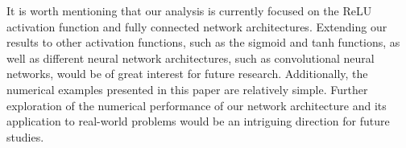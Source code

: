 \documentclass[nohyperref]{article}
\theoremstyle{plain}
\theoremstyle{definition}
\theoremstyle{remark}
\begin{document}
It is worth mentioning that our analysis is currently focused on the ReLU activation function and fully connected network architectures. Extending our results to other activation functions, such as the sigmoid and tanh functions, as well as different neural network architectures, such as convolutional neural networks, %
would be of great interest for future research.
Additionally, the numerical examples presented in this paper are relatively simple. Further exploration of the numerical performance of our network architecture and its application to real-world problems would be an intriguing direction for future studies. 

\end{document}
